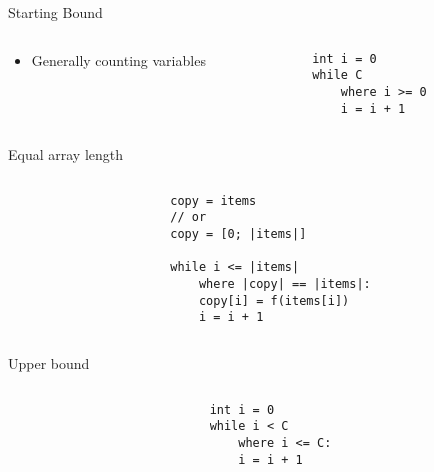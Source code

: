 \begin{frame}[fragile]{Starting Bound}

\begin{columns}

\begin{column}{0.5\textwidth}
\begin{itemize}
\item Generally counting variables
\end{itemize}

\end{column}

\begin{column}{0.5\textwidth}
\begin{verbatim}
int i = 0
while C
    where i >= 0
    i = i + 1
\end{verbatim}

\end{column}

\end{columns}

\end{frame}



\begin{frame}[fragile]{Equal array length}

\begin{columns}

\begin{column}{0.5\textwidth}
\end{column}

\begin{column}{0.5\textwidth}
\begin{verbatim}
copy = items
// or
copy = [0; |items|]

while i <= |items|
    where |copy| == |items|:
    copy[i] = f(items[i])
    i = i + 1
\end{verbatim}
\end{column}
\end{columns}

\end{frame}



\begin{frame}[fragile]{Upper bound}

\begin{columns}

\begin{column}{0.5\textwidth}
\end{column}

\begin{column}{0.5\textwidth}
\begin{verbatim}
int i = 0
while i < C
    where i <= C:
    i = i + 1
\end{verbatim}
\end{column}

\end{columns}

\end{frame}



